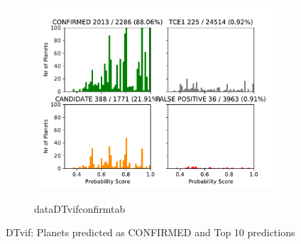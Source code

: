 \begin{figure}[H]
                \centering
                \begin{subfigure}{1\textwidth}
                \includegraphics[width = 1\textwidth]{data/DT_vif_pred_CONFIRMED.pdf}
                \end{subfigure}
                \begin{subfigure}{1\textwidth}
                \csname dataDTvifconfirmtab\endcsname
                \end{subfigure}
                \caption{DTvif: Planets predicted as CONFIRMED and Top 10 predictions}
                \label{fig:data/DT_vif_pred_CONFIRMED}
                \end{figure}